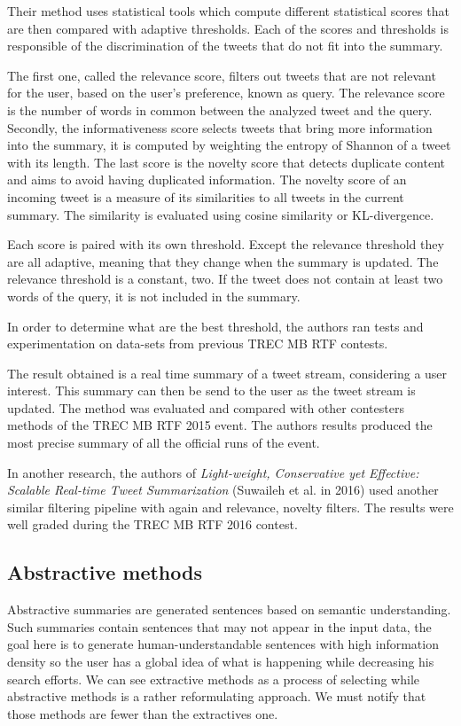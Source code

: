 \documentclass[runningheads]{llncs}
\begin{document}
Their method uses statistical tools which compute different statistical scores
that are then compared with adaptive thresholds. Each of the scores and
thresholds is responsible of the discrimination of the tweets that do not fit
into the summary.

The first one, called the relevance score, filters out tweets that are not
relevant for the user, based on the user's preference, known as query. The
relevance score is the number of words in common between the analyzed tweet and
the query. Secondly, the informativeness score selects tweets that bring more
information into the summary, it is computed by weighting the entropy of
Shannon of a tweet with its length. The last score is the novelty score that
detects duplicate content and aims to avoid having duplicated information. The
novelty score of an incoming tweet is a measure of its similarities to all
tweets in the current summary. The similarity is evaluated using cosine
similarity or KL-divergence.

Each score is paired with its own threshold. Except the relevance threshold
they are all adaptive, meaning that they change when the summary is updated.
The relevance threshold is a constant, two. If the tweet does not contain at
least two words of the query, it is not included in the summary.

In order to determine what are the best threshold, the authors ran tests and
experimentation on data-sets from previous TREC MB RTF contests.

The result obtained is a real time summary of a tweet stream, considering a
user interest. This summary can then be send to the user as the tweet stream is
updated. The method was evaluated and compared with other contesters methods of
the TREC MB RTF 2015 event. The authors results produced the most precise
summary of all the official runs of the event.

In another research, the authors of \textit{Light-weight, Conservative yet
Effective: Scalable Real-time Tweet Summarization} (Suwaileh et al. in 2016)
\cite{suwaileh_light-weight_nodate} used another similar filtering pipeline
with again and relevance, novelty filters. The results were well graded during
the TREC MB RTF 2016 contest.

\subsection{Abstractive methods}

Abstractive summaries are generated sentences based on semantic understanding.
Such summaries contain sentences that may not appear in the input data, the
goal here is to generate human-understandable sentences with high information
density so the user has a global idea of what is happening while decreasing his
search efforts. We can see extractive methods as a process of selecting while
abstractive methods is a rather reformulating approach. We must notify that
those methods are fewer than the extractives one.
\end{document}
